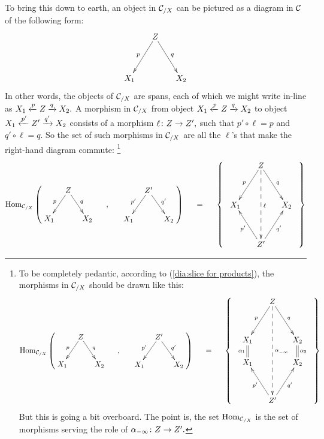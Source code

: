 \documentclass[CT4S-EN-RU]{subfiles}
\begin{document}
\begin{constructionENG}[Products]
To bring this down to earth, an object in $\mathcal{C}_{/X}$ can be pictured as a diagram in $\mathcal{C}$ of the following form:
$$\xymatrix@=15pt{&Z\ar[ldd]_p\ar[rdd]^q\\\\X_1&&X_2}$$   
In other words, the objects of $\mathcal{C}_{/X}$ are spans, each of which we might write in-line as $X_1\xleftarrow{p}Z\xrightarrow{q}X_2.$ A morphism in $\mathcal{C}_{/X}$ from object $X_1\xleftarrow{p}Z\xrightarrow{q}X_2$ to object $X_1\xleftarrow{p'}Z'\xrightarrow{q'}X_2$ consists of a morphism $\ell\colon Z\rightarrow Z',$ such that $p'\circ\ell=p$ and $q'\circ\ell=q.$ So the set of such morphisms in $\mathcal{C}_{/X}$ are all the $\ell$'s that make the right-hand diagram commute:
\footnote{To be completely pedantic, according to (\ref{dia:slice for products}), the morphisms in $\mathcal{C}_{/X}$ should be drawn like this:
\begin{align*}
\Hom_{\mcC_{/X}}\normalsize\left(\parbox{1in}{\xymatrix@=8pt{&Z\ar[ldd]_p\ar[rdd]^q\\\\X_1&&X_2}}\hspace{.2in},\hspace{.2in}\parbox{1in}{\xymatrix@=8pt{&Z'\ar[ldd]_{p'}\ar[rdd]^{q'}\\\\X_1&&X_2}}\right)\hspace{.2in}=\hspace{.2in}\left\{\;\;\parbox{1in}{\xymatrix@=15pt{&Z\ar[ldd]_{p}\ar[rdd]^{q}\ar@{-->}[ddddd]^{\alpha^{}_{-\infty}}\\\\X_1\ar@{=}[d]_{\alpha_1}&&X_2\ar@{=}[d]^{\alpha_2}\\X_1&&X_2\\\\&Z'\ar[uul]^{p'}\ar[uur]_{q'}}}\;\;\right\}
\end{align*}
But this is going a bit overboard. The point is, the set $\textnormal{Hom}_{\mathcal{C}_{/X}}$ is the set of morphisms serving the role of $\alpha_{-\infty}\colon Z\rightarrow Z'.$}
\begin{align}\label{dia:morphism of spans}
\Hom_{\mcC_{/X}}\normalsize\left(\parbox{1in}{\xymatrix@=8pt{&Z\ar[ldd]_p\ar[rdd]^q\\\\X_1&&X_2}}\hspace{.2in},\hspace{.2in}\parbox{1in}{\xymatrix@=8pt{&Z'\ar[ldd]_{p'}\ar[rdd]^{q'}\\\\X_1&&X_2}}\right)\hspace{.2in}=\hspace{.2in}\left\{\;\;\parbox{1in}{\xymatrix@=15pt{&Z\ar[ldd]_{p}\ar[rdd]^{q}\ar@{-->}[dddd]^\ell\\\\X_1&&X_2\\\\&Z'\ar[uul]^{p'}\ar[uur]_{q'}}}\;\;\right\}
\end{align}


\end{constructionENG}
\end{document}
